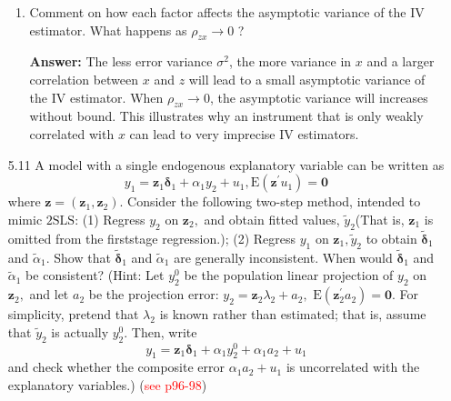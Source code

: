 \begin{enumerate}
\begin{enumerate}
        \item Comment on how each factor affects the asymptotic variance of the IV estimator. What happens as $\rho_{z x} \rightarrow 0$ ?
        
        \textbf{Answer:} The less error variance $\sigma^2$, the more variance in $x$ and a larger correlation between $x$ and $z$ will lead to a small asymptotic variance of the IV estimator. When $\rho_{z x} \rightarrow 0$, the asymptotic variance will increases without bound. This illustrates why an instrument that is only weakly correlated with $x$ can lead to very imprecise IV estimators.
    \end{enumerate}
    
    
    \item[5.11] A model with a single endogenous explanatory variable can be written as
    \[ y_{1}=\mathbf{z}_{1} \boldsymbol{\delta}_{1}+\alpha_{1} y_{2}+u_{1}, \mathrm{E}\left(\mathbf{z}^{\prime} u_{1}\right)=\mathbf{0} \]
    where $\mathbf{z}=\left(\mathbf{z}_{1}, \mathbf{z}_{2}\right) .$ Consider the following two-step method, intended to mimic $2 \mathrm{SLS}$: (1) Regress $y_{2}$ on $\mathbf{z}_{2},$ and obtain fitted values, $\tilde{y}_{2}$(That is, $\mathbf{z}_{1}$ is omitted from the firststage regression.); (2) Regress $y_{1}$ on $\mathbf{z}_{1}, \tilde{y}_{2}$ to obtain $\tilde{\boldsymbol{\delta}}_{1}$ and $\tilde{\alpha}_{1} .$ Show that $\tilde{\boldsymbol{\delta}}_{1}$ and $\tilde{\alpha}_{1}$ are generally inconsistent. When would $\tilde{\boldsymbol{\delta}}_{1}$ and $\tilde{\alpha}_{1}$ be consistent? (Hint: Let $y_{2}^{0}$ be the population linear projection of $y_{2}$ on $\mathbf{z}_{2},$ and let $a_{2}$ be the projection error: $y_{2}=\mathbf{z}_{2} \lambda_{2}+a_{2},$ $\mathrm{E}\left(\mathbf{z}_{2}^{\prime} a_{2}\right)=\mathbf{0} .$ For simplicity, pretend that $\lambda_{2}$ is known rather than estimated; that is, assume that $\tilde{y}_{2}$ is actually $y_{2}^{0}$. Then, write
    \[ y_{1}=\mathbf{z}_{1} \boldsymbol{\delta}_{1}+\alpha_{1} y_{2}^{0}+\alpha_{1} a_{2}+u_{1} \]
    and check whether the composite error $\alpha_{1} a_{2}+u_{1}$ is uncorrelated with the explanatory variables.) (\textcolor{red}{see p96-98})
    

\end{enumerate}
